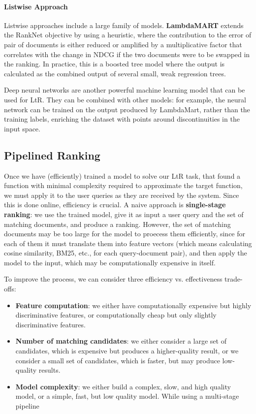 \paragraph{Listwise Approach}
Listwise approaches include a large family of models. \textbf{LambdaMART} extends the RankNet objective by using a heuristic, where the contribution to the error of pair of documents is either reduced or amplified by a multiplicative factor that correlates with the change in NDCG if the two documents were to be swapped in the ranking. In practice, this is a boosted tree model where the output is calculated as the combined output of several small, weak regression trees.

Deep neural networks are another powerful machine learning model that can be used for LtR. They can be combined with other models: for example, the neural network can be trained on the output produced by LambdaMart, rather than the training labels, enriching the dataset with points around discontinuities in the input space.

\subsection{Pipelined Ranking}
Once we have (efficiently) trained a model to solve our LtR task, that found a function with minimal complexity required to approximate the target function, we must apply it to the user queries as they are received by the system. Since this is done online, efficiency is crucial. A naive approach is \textbf{single-stage ranking}: we use the trained model, give it as input a user query and the set of matching documents, and produce a ranking. However, the set of matching documents may be too large for the model to proecess them efficiently, since for each of them it must translate them into feature vectors (which means calculating cosine similarity, BM25, etc., for each query-document pair), and then apply the model to the input, which may be computationally expensive in itself.

To improve the process, we can consider three efficiency vs. effectiveness trade-offs:
\begin{itemize}
    \item \textbf{Feature computation}: we either have computationally expensive but highly discriminative features, or computationally cheap but only slightly discriminative features. 
 
    \item \textbf{Number of matching candidates}: we either consider a large set of candidates, which is expensive but produces a higher-quality result, or we consider a small set of candidates, which is faster, but may produce low-quality results. 

    \item \textbf{Model complexity}: we either build a complex, slow, and high quality model, or a simple, fast, but low quality model. While using a multi-stage pipeline
\end{itemize}

